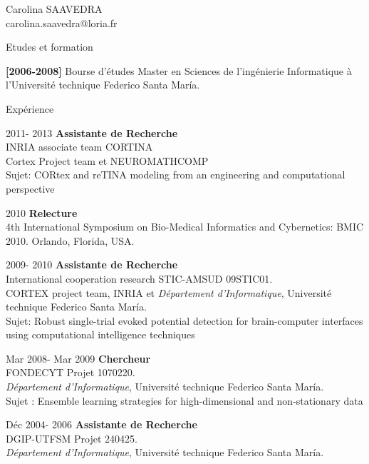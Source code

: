 \documentclass[letterpaper]{article}
\begin{document}
\begin{cv}{{\huge Carolina SAAVEDRA}\\
carolina.saavedra@loria.fr}
\begin{cvlist}{Etudes et formation}

\textbf{[2006-2008]} Bourse d'études Master en Sciences de l'ingénierie Informatique à l'Université technique Federico Santa María.

 

\end{cvlist}


\begin{cvlist}{Expérience}

\item[2011- 2013] \textbf{Assistante de Recherche}\\
 INRIA associate team CORTINA\\
Cortex Project team et NEUROMATHCOMP\\
Sujet: CORtex and reTINA modeling from an engineering and computational perspective

\item[2010] \textbf{Relecture}\\
  4th International Symposium on Bio-Medical Informatics and Cybernetics: 
  BMIC 2010. Orlando, Florida, USA.

\item[2009- 2010] \textbf{Assistante de Recherche}\\
International cooperation research STIC-AMSUD 09STIC01. \\
CORTEX project team, INRIA et {\it Département d'Informatique},
  Université technique Federico Santa María.\\
Sujet: Robust single-trial evoked potential detection for brain-computer interfaces using computational intelligence techniques

\item[Mar 2008- Mar 2009] \textbf{Chercheur}\\
  FONDECYT Projet 1070220.\\
{\it Département d'Informatique},
  Université technique Federico Santa María.\\
  Sujet : Ensemble learning strategies for high-dimensional and non-stationary data
  

\item[Déc 2004- 2006] \textbf{Assistante de Recherche}\\
   DGIP-UTFSM Projet 240425.\\
  {\it Département d'Informatique}, Université technique Federico Santa María.


\end{cvlist}
\end{cv}
\end{document}
